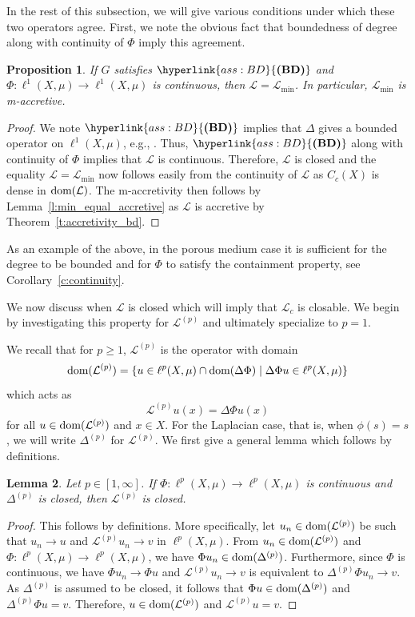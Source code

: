 \documentclass[letterpaper]{article}
\newtheorem{lemma}{Lemma}[section]
\newtheorem{proposition}[lemma]{Proposition}
\theoremstyle{definition}
\theoremstyle{named}
\numberwithin{equation}{section}
\newcommand{\BD}{\hyperlink{ass:BD}{\textup{\textbf{(BD)}}}}
\newcommand{\dom}{\textnormal{dom}} %
\newcommand{\Deltaphi}{\mathcal{L}}
\newcommand{\Deltaphip}{\mathcal{L}^{(p)}}
\newcommand{\ellp}{\ell^p(X,\mu)}
\newcommand{\deltaphim}{\mathcal{L}_{\min}}
\begin{document}
In the rest of this subsection, 
we will give various conditions under which these two operators agree.
First, we note the obvious fact that boundedness of degree along with continuity
of $\Phi$ imply this agreement.
\begin{proposition}\label{p:agreement}
    If $G$ satisfies $\BD$ and $\Phi\colon \ell^1(X,\mu) \to \ell^1(X,\mu)$ is
    continuous, then $\Deltaphi = \deltaphim$.
    In particular, $\deltaphim$ is m-accretive.
\end{proposition}
\begin{proof}
    We note $\BD$ implies that $\Delta$ gives a bounded operator
    on $\ell^1(X,\mu)$, e.g., \cite[Theorem~2.15]{keller2021graphs}.
    Thus, $\BD$ along with continuity of $\Phi$ implies that $\Deltaphi$
    is continuous. Therefore, 
    $\Deltaphi$ is closed and the equality $\Deltaphi=\deltaphim$ now follows
    easily from the continuity of $\Deltaphi$ as $C_c(X)$ is dense in $\dom(\Deltaphi)$. 
    The m-accretivity then follows by Lemma~\ref{l:min_equal_accretive} as $\Deltaphi$
    is accretive by Theorem~\ref{t:accretivity_bd}.
\end{proof}


As an example of the above,
in the porous medium case it is sufficient for the degree to be  bounded and 
for $\Phi$ to satisfy the containment property, see Corollary~\ref{c:continuity}. 

We now discuss when $\Deltaphi$ is closed which will imply
that $\Deltaphi_c$ is closable.
We begin by investigating this property 
for $\Deltaphip$ and ultimately specialize to $p=1$.

We recall that for $p \geq 1$, $\Deltaphip$ is the operator with domain
$$\dom(\Deltaphip)= \{u \in \ellp \cap \dom (\Delta \Phi) \mid \Delta \Phi u \in \ellp\}$$ 
which acts as
$$\Deltaphip u(x) = \Delta \Phi u(x)$$
for all $u \in \dom(\Deltaphip)$ and $x \in X$.
For the Laplacian case, that is, when $\phi(s)=s$, we will write $\Delta^{(p)}$ for $\Deltaphip$.
We first give a general lemma
which follows by definitions.

\begin{lemma}\label{l:PT_closed}
Let $p \in [1,\infty]$.
If $\Phi\colon \ell^p(X,\mu) \to \ell^p(X,\mu)$ is continuous
and $\Delta^{(p)}$ is closed, then $\Deltaphip$ is closed.
\end{lemma}
\begin{proof}
This follows by definitions. More specifically, let $u_n \in \dom(\Deltaphip)$
be such that $u_n \to u$ and $\Deltaphip u_n \to v$ in $\ell^p(X,\mu)$.
From $u_n \in \dom(\Deltaphip)$ and $\Phi \colon\ell^p(X,\mu) \to \ell^p(X,\mu)$, we have 
$\Phi u_n \in \dom(\Delta^{(p)})$. Furthermore, since $\Phi$ is continuous,
we have $\Phi u_n \to \Phi u$ and $\Deltaphip u_n \to v$ is equivalent to
$\Delta^{(p)}\Phi u_n \to v$. As $\Delta^{(p)}$
is assumed to be closed, it follows that $\Phi u \in \dom(\Delta^{(p)})$ 
and $\Delta^{(p)}\Phi u =v$. Therefore, $u \in \dom(\Deltaphip)$ and $\Deltaphip u =v$.
\end{proof}
\end{document}
